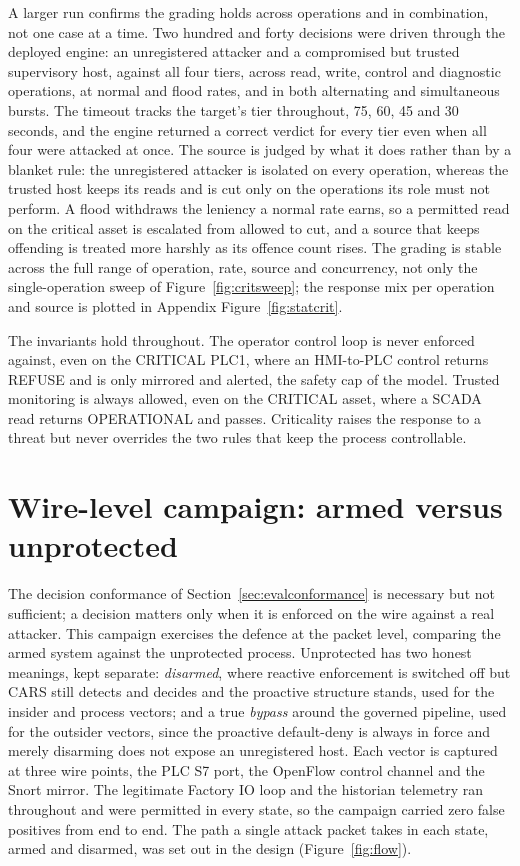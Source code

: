 A larger run confirms the grading holds across operations and in combination, not one case at a time. Two hundred and forty decisions were driven through the deployed engine: an unregistered attacker and a compromised but trusted supervisory host, against all four tiers, across read, write, control and diagnostic operations, at normal and flood rates, and in both alternating and simultaneous bursts. The timeout tracks the target's tier throughout, 75, 60, 45 and 30 seconds, and the engine returned a correct verdict for every tier even when all four were attacked at once. The source is judged by what it does rather than by a blanket rule: the unregistered attacker is isolated on every operation, whereas the trusted host keeps its reads and is cut only on the operations its role must not perform. A flood withdraws the leniency a normal rate earns, so a permitted read on the critical asset is escalated from allowed to cut, and a source that keeps offending is treated more harshly as its offence count rises. The grading is stable across the full range of operation, rate, source and concurrency, not only the single-operation sweep of Figure~\ref{fig:critsweep}; the response mix per operation and source is plotted in Appendix Figure~\ref{fig:statcrit}.

The invariants hold throughout. The operator control loop is never enforced against, even on the CRITICAL PLC1, where an HMI-to-PLC control returns REFUSE and is only mirrored and alerted, the safety cap of the model. Trusted monitoring is always allowed, even on the CRITICAL asset, where a SCADA read returns OPERATIONAL and passes. Criticality raises the response to a threat but never overrides the two rules that keep the process controllable.

\section{Wire-level campaign: armed versus unprotected}
\label{sec:evalcampaign}

The decision conformance of Section~\ref{sec:evalconformance} is necessary but not sufficient; a decision matters only when it is enforced on the wire against a real attacker. This campaign exercises the defence at the packet level, comparing the armed system against the unprotected process. Unprotected has two honest meanings, kept separate: \emph{disarmed}, where reactive enforcement is switched off but CARS still detects and decides and the proactive structure stands, used for the insider and process vectors; and a true \emph{bypass} around the governed pipeline, used for the outsider vectors, since the proactive default-deny is always in force and merely disarming does not expose an unregistered host. Each vector is captured at three wire points, the PLC S7 port, the OpenFlow control channel and the Snort mirror. The legitimate Factory IO loop and the historian telemetry ran throughout and were permitted in every state, so the campaign carried zero false positives from end to end. The path a single attack packet takes in each state, armed and disarmed, was set out in the design (Figure~\ref{fig:flow}).

